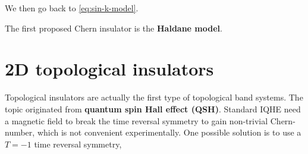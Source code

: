 \documentclass[hyperref, a4paper]{article}
\newcommand*{\concept}[1]{{\textbf{#1}}}
\begin{document}
We then go back to \eqref{eq:sin-k-model}.

The first proposed Chern insulator is the \concept{Haldane model}. 

\section{2D topological insulators}

Topological insulators are actually the first type of topological band systems. The topic originated from 
\concept{quantum spin Hall effect (QSH)}. Standard IQHE need a magnetic field to break the time reversal 
symmetry to gain non-trivial Chern-number, which is not convenient experimentally. One possible solution 
is to use a $T=-1$ time reversal symmetry, 





\end{document}
